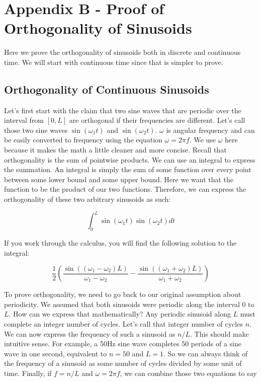 
	\section*{Appendix B - Proof of Orthogonality of Sinusoids}

	Here we prove the orthogonality of sinusoids both in discrete and continuous time.  We will start with continuous time since that is simpler to prove.  
	
	\subsection*{Orthogonality of Continuous Sinusoids}
	Let's first start with the claim that two sine waves that are periodic over the interval from 
	$[0, L]$ are orthogonal if their frequencies are different.  Let's call those two sine waves
	$\sin(\omega_1 t)$ and $ \sin(\omega_2 t )$.  $\omega$ is angular frequency and can
	be easily converted to frequency using the equation $\omega = 2\pi f$.  We use $\omega$ here because it makes the
	math a little cleaner and more concise.  Recall that orthogonality is the sum of pointwise products.  We
	can use an integral to express the summation.  An integral is simply the sum of some function over every point 
	between some lower bound and some upper bound.  Here we want that the function to be the product of our two
	functions.  Therefore, we can express the orthogonality of these two arbitrary sinusoids as such:
	
	\begin{equation}
		\label{eq:ip}
		\int_{0}^{L}\sin(\omega_1 t)\sin(\omega_2 t)dt
	\end{equation}
	
	If you work through the calculus, you will find the following solution to the integral:
	
	\begin{equation}
		\frac{1}{2}\left(\frac{\sin((\omega_1 - \omega_2)L)}{\omega_1 - \omega_2} - \frac{\sin((\omega_1 + \omega_2)L)}{\omega_1 + \omega_2}\right)
		\label{eq:orth}
	\end{equation}
	
	To prove orthogonality, we need to go back to our original assumption about periodicity.  We assumed that 
	both sinusoids were periodic along the interval 0 to $L$.  How can we express that mathematically?  Any periodic
	sinusoid along $L$ must complete an integer number of cycles.  Let's call that integer number of cycles $n$.  
	We can now express the frequency of such a sinusoid as $n/L$.  This should make intuitive sense.  For
	example, a 50Hz sine wave completes 50 periods of a sine wave in one second, equivalent to $n = 50$ and $L = 1$.
	So we can always think of the frequency of a sinusoid as some number of cycles divided by some unit of time.  
	Finally, if $f = n/L$ and $\omega = 2\pi f$, we can combine those two equations to say 
	
